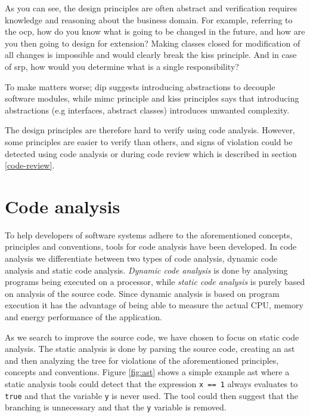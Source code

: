 \documentclass{report}
\begin{document}
As you can see, the design principles are often abstract and verification requires knowledge and reasoning about the business domain. For example, referring to the \gls{ocp}, how do you know what is going to be changed in the future, and how are you then going to design for extension? Making classes closed for modification of all changes is impossible and would clearly break the \gls{kiss} principle. And in case of \gls{srp}, how would you determine what is a single responsibility? 

To make matters worse; \gls{dip} suggests introducing abstractions to decouple software modules, while \gls{mimc} principle and \gls{kiss} principles says that introducing abstractions (e.g interfaces, abstract classes) introduces unwanted complexity.

The design principles are therefore hard to verify using code analysis. However, some principles are easier to verify than others, and signs of violation could be detected using code analysis or during code review which is described in section \ref{code-review}.

\section{Code analysis}
To help developers of software systems adhere to the aforementioned concepts, principles and conventions, tools for code analysis have been developed. In code analysis we differentiate between two types of code analysis, dynamic code analysis and static code analysis. \textit{Dynamic code analysis} is done by analysing programs being executed on a processor, while \textit{static code analysis} is purely based on analysis of the source code. Since dynamic analysis is based on program execution it has the advantage of being able to measure the actual CPU, memory and energy performance of the application. 


As we search to improve the source code, we have chosen to focus on static code analysis. The static analysis is done by parsing the source code, creating an \gls{ast} and then analyzing the tree for violations of the aforementioned principles, concepts and conventions. Figure \ref{fig:ast} shows a simple example \gls{ast} where a static analysis tools could detect that the expression \texttt{x == 1} always evaluates to \texttt{true} and that the variable \texttt{y} is never used. The tool could then suggest that the branching is unnecessary and that the \texttt{y} variable is removed.  
\end{document}
